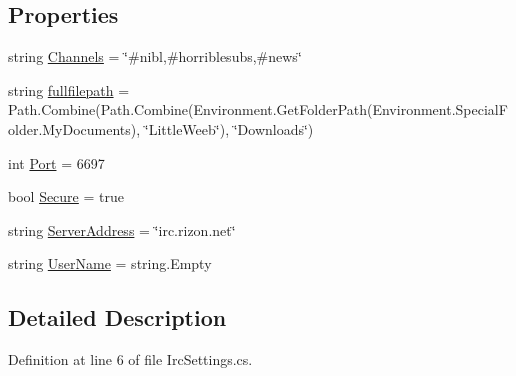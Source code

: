 \subsection*{Properties}
\begin{DoxyCompactItemize}
\item 
string \mbox{\hyperlink{class_little_weeb_library_1_1_settings_1_1_irc_settings_a395d5d33ff9f9699551a38b4ab6866e4}{Channels}} = \char`\"{}\#nibl,\#horriblesubs,\#news\char`\"{}
\item 
string \mbox{\hyperlink{class_little_weeb_library_1_1_settings_1_1_irc_settings_ad1f67b09e16ba2b5fed2dcdefeac8e1a}{fullfilepath}} = Path.\+Combine(Path.\+Combine(Environment.\+Get\+Folder\+Path(Environment.\+Special\+Folder.\+My\+Documents), \char`\"{}Little\+Weeb\char`\"{}), \char`\"{}Downloads\char`\"{})
\item 
int \mbox{\hyperlink{class_little_weeb_library_1_1_settings_1_1_irc_settings_a13491703ff0e9a96c87743e70002f6fe}{Port}} = 6697
\item 
bool \mbox{\hyperlink{class_little_weeb_library_1_1_settings_1_1_irc_settings_aea7952c2d3db87eb5609feae15c5475c}{Secure}} = true
\item 
string \mbox{\hyperlink{class_little_weeb_library_1_1_settings_1_1_irc_settings_a99953f00fc76a98af0bd06129876d5ef}{Server\+Address}} = \char`\"{}irc.\+rizon.\+net\char`\"{}
\item 
string \mbox{\hyperlink{class_little_weeb_library_1_1_settings_1_1_irc_settings_a1a400295f11e155e37002041410e47f1}{User\+Name}} = string.\+Empty
\end{DoxyCompactItemize}


\subsection{Detailed Description}


Definition at line 6 of file Irc\+Settings.\+cs.



